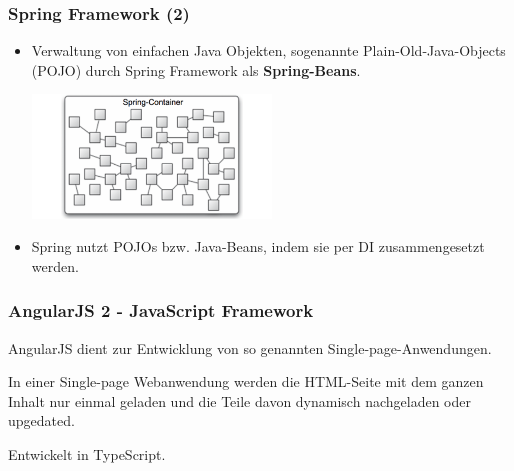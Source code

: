 \documentclass{beamer} %
\begin{document}
\begin{frame}
\frametitle{Spring Framework (2)}
\begin{itemize}
\item Verwaltung von einfachen Java Objekten, sogenannte Plain-Old-Java-Objects (POJO) durch Spring Framework als \textbf{Spring-Beans}.
\begin{center}
\includegraphics[width=0.5\textwidth]{img/container}
\end{center}
\item Spring nutzt POJOs bzw. Java-Beans, indem sie per DI zusammengesetzt werden.
\end{itemize}
\end{frame}

%


\begin{frame}
\frametitle{AngularJS 2 - JavaScript Framework}

AngularJS dient zur Entwicklung von so genannten Single-page-Anwendungen.\newline

In einer Single-page Webanwendung werden die HTML-Seite mit dem ganzen Inhalt nur einmal geladen und die Teile davon dynamisch nachgeladen oder upgedated.\newline

Entwickelt in TypeScript.
\end{frame}
\end{document}
